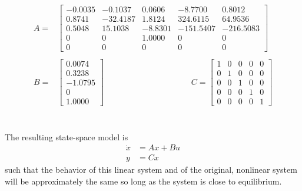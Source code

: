 \documentclass[12pt]{article}
\begin{document}
\begin{equation}
\begin{aligned}
\label{eqnJacob} 
A =& \begin{bmatrix} 
-0.0035  & -0.1037  &  0.0606 &  -8.7700   &  0.8012 \\ 0.8741 & -32.4187 & 1.8124 & 324.6115 & 64.9536 \\ 0.5048 &  15.1038  & -8.8301 & -151.5407 & -216.5083 \\0     &    0   & 1.0000    &     0     &    0 \\0    &     0    &     0    &     0    &     0

\end{bmatrix}
\\ \\
B =& 
\begin{bmatrix} 
  0.0074 \\
    0.3238 \\
   -1.0795 \\
         0 \\
    1.0000
\end{bmatrix} 
\qquad \qquad \qquad \qquad \qquad \; \;
C =
\begin{bmatrix} 1 & 0 & 0 & 0 & 0\\ 0 & 1 & 0 & 0 & 0 \\ 0 & 0 & 1 & 0 & 0 \\ 0 & 0 & 0 & 1 & 0 \\ 0 & 0 & 0 & 0 & 1\end{bmatrix}
\end{aligned}
\end{equation}
\\ \\
The resulting state-space model is
\begin{align*}
\dot{x} &= Ax+Bu \\
y &= Cx
\end{align*}
such that the behavior of this linear system and of the original, nonlinear system will be approximately the same so long as the system is close to equilibrium.
\end{document}
